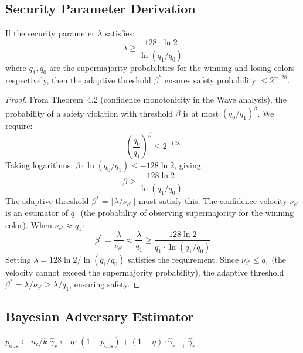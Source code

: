 \subsection{Security Parameter Derivation}

\begin{theorem}
\label{thm:adaptive-safety}
If the security parameter $\lambda$ satisfies:
\[
\lambda \geq \frac{128 \cdot \ln 2}{\ln(q_1 / q_0)}
\]
where $q_1, q_0$ are the supermajority probabilities for the winning and losing colors
respectively, then the adaptive threshold $\beta^*$ ensures safety probability
$\leq 2^{-128}$.
\end{theorem}

\begin{proof}
From Theorem~4.2 (confidence monotonicity in the Wave analysis), the probability of
a safety violation with threshold $\beta$ is at most $(q_0/q_1)^\beta$. We require:
\[
\left(\frac{q_0}{q_1}\right)^\beta \leq 2^{-128}
\]
Taking logarithms: $\beta \cdot \ln(q_0/q_1) \leq -128 \ln 2$, giving:
\[
\beta \geq \frac{128 \ln 2}{\ln(q_1/q_0)}
\]
The adaptive threshold $\beta^* = \lceil \lambda / \nu_{c^*} \rceil$ must satisfy this.
The confidence velocity $\nu_{c^*}$ is an estimator of $q_1$ (the probability of
observing supermajority for the winning color). When $\nu_{c^*} \approx q_1$:
\[
\beta^* = \frac{\lambda}{\nu_{c^*}} \approx \frac{\lambda}{q_1} \geq \frac{128 \ln 2}{q_1 \cdot \ln(q_1/q_0)}
\]
Setting $\lambda = 128 \ln 2 / \ln(q_1/q_0)$ satisfies the requirement. Since
$\nu_{c^*} \leq q_1$ (the velocity cannot exceed the supermajority probability), the
adaptive threshold $\beta^* = \lambda/\nu_{c^*} \geq \lambda/q_1$, ensuring safety.
\end{proof}

\subsection{Bayesian Adversary Estimator}

\begin{algorithm}[H]
\caption{Online Bayesian Adversary Estimator}
\label{alg:bayes-estimator}
\begin{algorithmic}[1]
    \State {}
    \State $p_{\text{obs}} \gets n_c / k$ 
    \State {}
    \State $\hat{\gamma}_r \gets \eta \cdot (1 - p_{\text{obs}}) + (1 - \eta) \cdot \hat{\gamma}_{r-1}$
    \State \Return $\hat{\gamma}_r$
\EndFunction
\end{algorithmic}
\end{algorithm}

